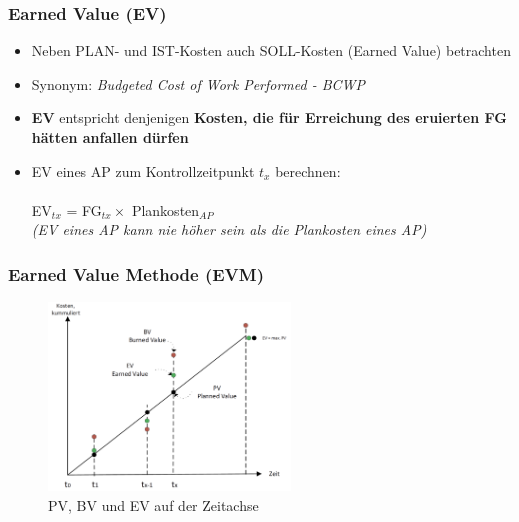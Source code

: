\documentclass[a4paper]{article}
\begin{document}
		\subsubsection{Earned Value (EV)}
		
		\begin{itemize}
			\item Neben PLAN- und IST-Kosten auch SOLL-Kosten (Earned Value) betrachten
			\item Synonym: \textit{Budgeted Cost of Work Performed - BCWP}
			\item \textbf{EV} entspricht denjenigen \textbf{Kosten, die für Erreichung des eruierten FG hätten anfallen dürfen}
			\item EV eines AP zum Kontrollzeitpunkt $t_x$ berechnen:\\
			\\
			EV$_{tx}$ = FG$_{tx} \times$ Plankosten$_{AP}$\\
			\textit{(EV eines AP kann nie höher sein als die Plankosten eines AP)}
		\end{itemize}
	
\newpage

		\subsubsection{Earned Value Methode (EVM)}
		
		\begin{figure}[!htb]
			\centering
			\includegraphics[height=5cm]{img/pm/evm_dia.png}
			\caption{PV, BV und EV auf der Zeitachse}
			\label{fig:pm_evm_dia}
		\end{figure}
		
\end{document}
